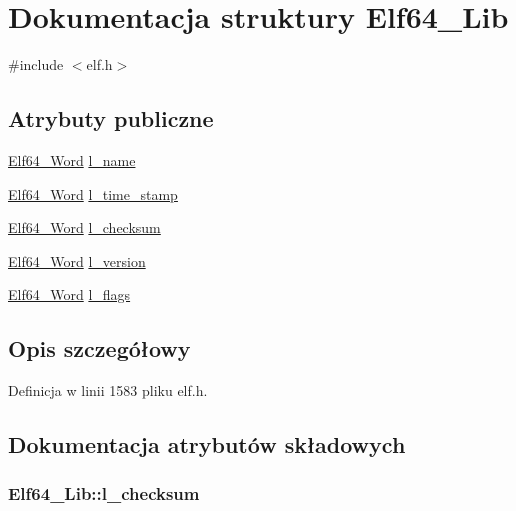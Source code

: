 \hypertarget{struct_elf64___lib}{\section{Dokumentacja struktury Elf64\-\_\-\-Lib}
\label{struct_elf64___lib}
}


{\ttfamily \#include $<$elf.\-h$>$}

\subsection*{Atrybuty publiczne}
\begin{DoxyCompactItemize}
\item 
\hyperlink{elf_8h_aa3aa1920ed115b7ef7e99716fece4401}{Elf64\-\_\-\-Word} \hyperlink{struct_elf64___lib_ac7f21d23c86f56c6583aa563eb960af0}{l\-\_\-name}
\item 
\hyperlink{elf_8h_aa3aa1920ed115b7ef7e99716fece4401}{Elf64\-\_\-\-Word} \hyperlink{struct_elf64___lib_ace001f85c3f31e91fedf4a1a1f923af5}{l\-\_\-time\-\_\-stamp}
\item 
\hyperlink{elf_8h_aa3aa1920ed115b7ef7e99716fece4401}{Elf64\-\_\-\-Word} \hyperlink{struct_elf64___lib_a11f09b77bcae792d5e5c120b4a0fbcca}{l\-\_\-checksum}
\item 
\hyperlink{elf_8h_aa3aa1920ed115b7ef7e99716fece4401}{Elf64\-\_\-\-Word} \hyperlink{struct_elf64___lib_ab03d7034a6f1113717a9eefe33cb8343}{l\-\_\-version}
\item 
\hyperlink{elf_8h_aa3aa1920ed115b7ef7e99716fece4401}{Elf64\-\_\-\-Word} \hyperlink{struct_elf64___lib_ac78fa7eafc377b04fcaf575c61dc2b60}{l\-\_\-flags}
\end{DoxyCompactItemize}


\subsection{Opis szczegółowy}


Definicja w linii 1583 pliku elf.\-h.



\subsection{Dokumentacja atrybutów składowych}
\hypertarget{struct_elf64___lib_a11f09b77bcae792d5e5c120b4a0fbcca}{
\subsubsection[{l\-\_\-checksum}]{ Elf64\-\_\-\-Lib\-::l\-\_\-checksum}}\label{struct_elf64___lib_a11f09b77bcae792d5e5c120b4a0fbcca}


